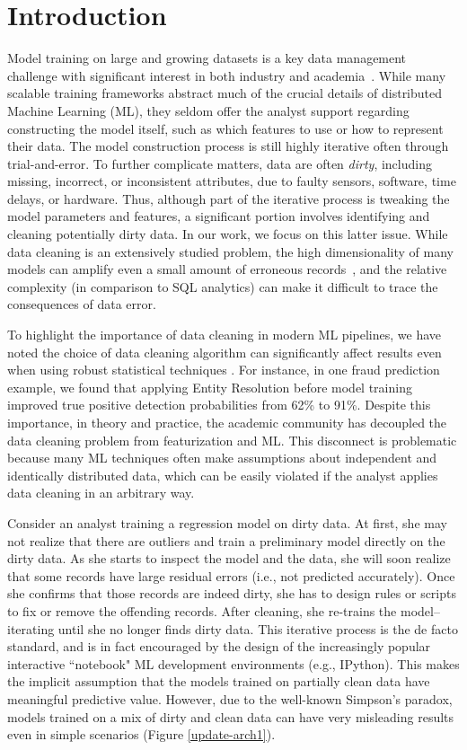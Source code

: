 \section{Introduction}\sloppy
Model training on large and growing datasets is a key data management challenge with significant interest in both industry and academia~\cite{bdas, crotty2014tupleware, tensor}.
While many scalable training frameworks abstract much of the crucial details of distributed Machine Learning (ML), they seldom offer the analyst support regarding constructing the model itself, such as which features to use or how to represent their data.
The model construction process is still highly iterative often through trial-and-error. 
To further complicate matters, data are often \emph{dirty}, including missing, incorrect, or inconsistent attributes, due to faulty sensors, software, time delays, or hardware.
Thus, although part of the iterative process is tweaking the model parameters and features, a significant portion involves identifying and cleaning potentially dirty data.  
In our work, we focus on this latter issue. 
While data cleaning is an extensively studied problem, the high dimensionality of many models can amplify even a small amount of erroneous records~\cite{xiaofeature}, and the relative complexity (in comparison to SQL analytics) can make it difficult to trace the consequences of data error.

To highlight the importance of data cleaning in modern ML pipelines, we have noted the choice of data cleaning algorithm can significantly affect results even when using robust statistical techniques \cite{activecleanarxiv, DBLP:conf/case/MahlerKLSMKPWFAG14}.
For instance, in one fraud prediction example, we found that applying Entity Resolution before model training improved true positive detection probabilities from 62\% to 91\%. 
Despite this importance, in theory and practice, the academic community has decoupled the data cleaning problem from featurization and ML.
This disconnect is problematic because many ML techniques often make assumptions about independent and identically distributed data, which can be easily violated if the analyst applies data cleaning in an arbitrary way.

Consider an analyst training a regression model on dirty data. 
At first, she may not realize that there are outliers and train a preliminary model directly on the dirty data. 
As she starts to inspect the model and the data, she will soon realize that some records have large residual errors (i.e., not predicted accurately). 
Once she confirms that those records are indeed dirty, she has to design rules or scripts to fix or remove the offending records. 
After cleaning, she re-trains the model--iterating until she no longer finds dirty data.
This iterative process is the de facto standard, and is in fact encouraged by the design of the increasingly popular interactive ``notebook" ML development environments (e.g., IPython).
This makes the implicit assumption that the models trained on partially clean data have meaningful predictive value.
However, due to the well-known Simpson's paradox, models trained on a mix of dirty and clean data can have very misleading results even in simple scenarios (Figure \ref{update-arch1}).


